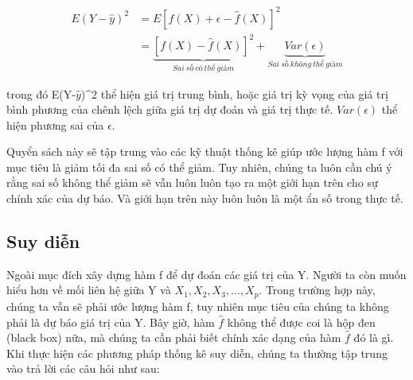 \documentclass[
  12pt,
]{krantz}
\begin{document}
\begin{align}
E(Y-\hat{y})^2 &= E[f(X) + \epsilon - \hat{f}(X)]^2 \\
&= \underbrace{[f(X) - \hat{f}(X)]^2}_{Sai \ số \ có \ thể \ giảm} +\underbrace{Var(\epsilon)}_{Sai \ số \ không \ thể \ giảm}
\end{align}

trong đó E(Y-\(\hat{y}\))\^{}2 thể hiện giá trị trung bình, hoặc giá trị kỳ vọng của giá trị bình phương của chênh lệch giữa giá trị dự đoán và giá trị thực tế. \(Var(\epsilon)\) thể hiện phương sai của \(\epsilon\).

Quyển sách này sẽ tập trung vào các kỹ thuật thống kê giúp ước lượng hàm f với mục tiêu là giảm tối đa sai số có thể giảm. Tuy nhiên, chúng ta luôn cần chú ý rằng sai số không thể giảm sẽ vẫn luôn luôn tạo ra một giới hạn trên cho sự chính xác của dự báo. Và giới hạn trên này luôn luôn là một ẩn số trong thực tế.

\hypertarget{suy-diux1ec5n}{%
\subsection{Suy diễn}\label{suy-diux1ec5n}}

Ngoài mục đích xây dựng hàm f để dự đoán các giá trị của Y. Người ta còn muốn hiểu hơn về mối liên hệ giữa Y và \(X_1, X_2, X_3,...,X_p\). Trong trường hợp này, chúng ta vẫn sẽ phải ước lượng hàm f, tuy nhiên mục tiêu của chúng ta không phải là dự báo giá trị của Y. Bây giờ, hàm \(\hat{f}\) không thể được coi là hộp đen (black box) nữa, mà chúng ta cần phải biết chính xác dạng của hàm \(\hat{f}\) đó là gì. Khi thực hiện các phương pháp thống kê suy diễn, chúng ta thường tập trung vào trả lời các câu hỏi như sau:
\end{document}
